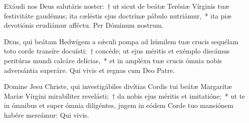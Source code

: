 \documentclass[vesperale_romanum.tex]{subfiles}
\begin{document}
\capitdeseq

\myrule


\duplex

\hymnusbothvespers


\oratio

\lettrine{E}{x}áudi nos Deus salutáris noster:~† ut sicut de beátæ Terésiæ Vírginis tuæ festivitáte gaudémus; ita cæléstis ejus doctrínæ pábulo nutriámur,~* ita piæ devotiónis erudiámur affé\-ctu. Per Dóminum nostrum.


\commsequentis

\myrule


\semiduplex


\oratio

\lettrine{D}{e}us, qui beátam Hedwígem a sǽculi pompa ad húmilem tuæ crucis sequélam toto corde transíre docuísti:~† concéde; ut ejus méritis et exémplo discámus peritúras mundi calcáre delícias,~* et in ampléxu tuæ crucis ómnia nobis adversántia superáre.
Qui vivis et regnas cum Deo Patre.

\vespsequentiscomm

\myrule

\newpage


\duplex

\oratio

\lettrine{D}{o}mine Jesu Christe, qui investigábiles divítias Cordis tui beátæ Margarítæ Maríæ Vírgini mirabíliter revelásti;~† da nobis ejus méritis et imitatióne;~* ut te in ómnibus et super ómnia diligéntes, jugem in eódem Corde tuo mansiónem habére mereámur:
Qui vivis.


\end{document}
